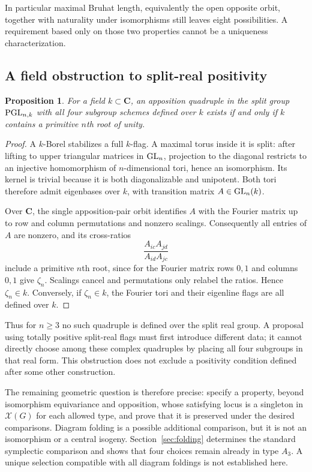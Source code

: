 \documentclass[11pt]{article}
\newcommand{\C}{\mathbf C}\newcommand{\Z}{\mathbf Z}\newcommand{\Q}{\mathbf Q}
\newtheorem{proposition}[theorem]{Proposition}
\theoremstyle{definition}\newtheorem{definition}[theorem]{Definition}
\theoremstyle{remark}\newtheorem{remark}[theorem]{Remark}
\begin{document}
In particular maximal Bruhat length, equivalently the open opposite orbit, together with naturality under isomorphisms still leaves eight possibilities. A requirement based only on those two properties cannot be a uniqueness characterization.

\subsection{A field obstruction to split-real positivity}
\begin{proposition}\label{prop:field}
For a field $k\subset\C$, an apposition quadruple in the split group $\operatorname{PGL}_{n,k}$ with all four subgroup schemes defined over $k$ exists if and only if $k$ contains a primitive $n$th root of unity.
\end{proposition}
\begin{proof}
A $k$-Borel stabilizes a full $k$-flag. A maximal torus inside it is split: after lifting to upper triangular matrices in $\operatorname{GL}_n$, projection to the diagonal restricts to an injective homomorphism of $n$-dimensional tori, hence an isomorphism. Its kernel is trivial because it is both diagonalizable and unipotent. Both tori therefore admit eigenbases over $k$, with transition matrix $A\in\operatorname{GL}_n(k)$.

Over $\C$, the single apposition-pair orbit identifies $A$ with the Fourier matrix up to row and column permutations and nonzero scalings. Consequently all entries of $A$ are nonzero, and its cross-ratios
\[
 \frac{A_{ic}A_{jd}}{A_{id}A_{jc}}
\]
include a primitive $n$th root, since for the Fourier matrix rows $0,1$ and columns $0,1$ give $\zeta_n$. Scalings cancel and permutations only relabel the ratios. Hence $\zeta_n\in k$. Conversely, if $\zeta_n\in k$, the Fourier tori and their eigenline flags are all defined over $k$.
\end{proof}

Thus for $n\geq3$ no such quadruple is defined over the split real group. A proposal using totally positive split-real flags must first introduce different data; it cannot directly choose among these complex quadruples by placing all four subgroups in that real form. This obstruction does not exclude a positivity condition defined after some other construction.

The remaining geometric question is therefore precise: specify a property, beyond isomorphism equivariance and opposition, whose satisfying locus is a singleton in $\mathcal X(G)$ for each allowed type, and prove that it is preserved under the desired comparisons. Diagram folding is a possible additional comparison, but it is not an isomorphism or a central isogeny. Section~\ref{sec:folding} determines the standard symplectic comparison and shows that four choices remain already in type $A_3$. A unique selection compatible with all diagram foldings is not established here.
\end{document}
